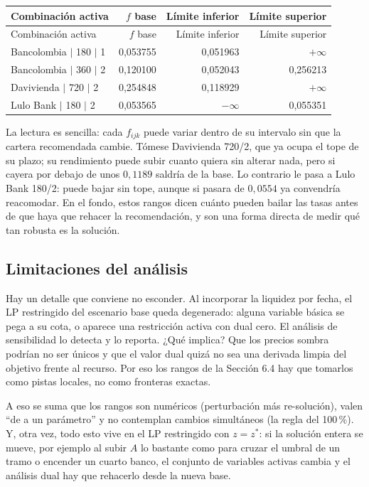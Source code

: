 \documentclass[11pt,a4paper]{article}
\begin{document}
\begin{longtable}{l r r r}
\toprule
Combinación activa & $f$ base & Límite inferior & Límite superior \\
\midrule
\endfirsthead
\toprule
Combinación activa & $f$ base & Límite inferior & Límite superior \\
\midrule
\endhead
Bancolombia $\mid$ 180 $\mid$ 1 & 0,053755 & 0,051963 & $+\infty$ \\
Bancolombia $\mid$ 360 $\mid$ 2 & 0,120100 & 0,052043 & 0,256213 \\
Davivienda $\mid$ 720 $\mid$ 2 & 0,254848 & 0,118929 & $+\infty$ \\
Lulo Bank $\mid$ 180 $\mid$ 2 & 0,053565 & $-\infty$ & 0,055351 \\
\bottomrule
\end{longtable}

La lectura es sencilla: cada $f_{ijk}$ puede variar dentro de su intervalo sin que la cartera
recomendada cambie. Tómese Davivienda 720/2, que ya ocupa el tope de su plazo; su rendimiento
puede subir cuanto quiera sin alterar nada, pero si cayera por debajo de unos $0{,}1189$ saldría
de la base. Lo contrario le pasa a Lulo Bank 180/2: puede bajar sin tope, aunque si pasara de
$0{,}0554$ ya convendría reacomodar. En el fondo, estos rangos dicen cuánto pueden bailar las
tasas antes de que haya que rehacer la recomendación, y son una forma directa de medir qué tan
robusta es la solución.

\subsection{Limitaciones del análisis}

Hay un detalle que conviene no esconder. Al incorporar la liquidez por fecha, el LP restringido del
escenario base queda degenerado: alguna variable
básica se pega a su cota, o aparece una restricción activa con dual cero. El análisis de
sensibilidad lo detecta y lo reporta. ¿Qué implica? Que los precios sombra podrían no ser únicos y que el
valor dual quizá no sea una derivada limpia del objetivo frente al recurso. Por eso los rangos
de la Sección 6.4 hay que tomarlos como pistas locales, no como fronteras exactas.

A eso se suma que los rangos son numéricos (perturbación más re-solución), valen ``de a un
parámetro'' y no contemplan cambios simultáneos (la regla del 100\,\%). Y, otra vez, todo esto
vive en el LP restringido con $z = z^*$: si la solución entera se mueve, por ejemplo al subir
$A$ lo bastante como para cruzar el umbral de un tramo o encender un cuarto banco, el conjunto de
variables activas cambia y el análisis dual hay que rehacerlo desde la nueva base.
\end{document}
